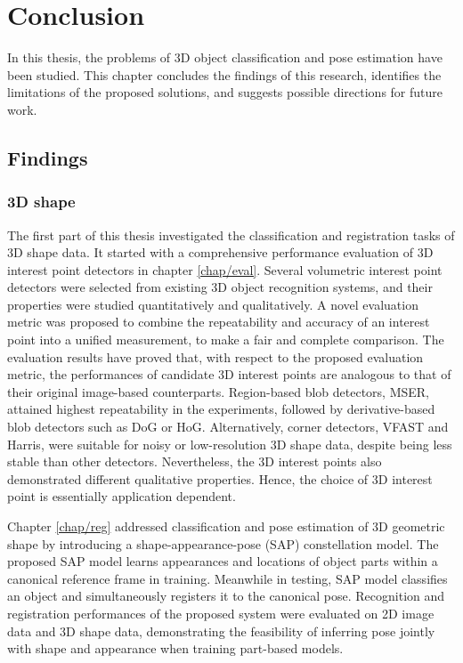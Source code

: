 \chapter{Conclusion}
\label{chap/conclusion}

In this thesis, the problems of 3D object classification and pose estimation have been studied. This chapter concludes the findings of this research, identifies the limitations of the proposed solutions, and suggests possible directions for future work.  

\section{Findings}

\subsection{3D shape}

The first part of this thesis investigated the classification and registration tasks of 3D shape data. It started with a comprehensive performance evaluation of 3D interest point detectors in chapter \ref{chap/eval}. 
Several volumetric interest point detectors were selected from existing 3D object recognition systems, and their properties were studied quantitatively and qualitatively. 
A novel evaluation metric was proposed to combine the repeatability and accuracy of an interest point into a unified measurement, to make a fair and complete comparison.  
The evaluation results have proved that, with respect to the proposed evaluation metric, the performances of candidate 3D interest points are analogous to that of their original image-based counterparts. Region-based blob detectors, \eg MSER, attained highest repeatability in the experiments, followed by derivative-based blob detectors such as DoG or HoG. Alternatively, corner detectors, \eg VFAST and Harris, were suitable for noisy or low-resolution 3D shape data, despite being less stable than other detectors.  
Nevertheless, the 3D interest points also demonstrated different qualitative properties. Hence, the choice of 3D interest point is essentially application dependent. 

Chapter \ref{chap/reg} addressed classification and pose estimation of 3D geometric shape by introducing a shape-appearance-pose (SAP) constellation model. 
The proposed SAP model learns appearances and locations of object parts within a canonical reference frame in training. Meanwhile in testing, SAP model classifies an object and simultaneously registers it to the canonical pose. 
Recognition and registration performances of the proposed system were evaluated on 2D image data and 3D shape data, demonstrating the feasibility of inferring pose jointly with shape and appearance when training part-based models. 

